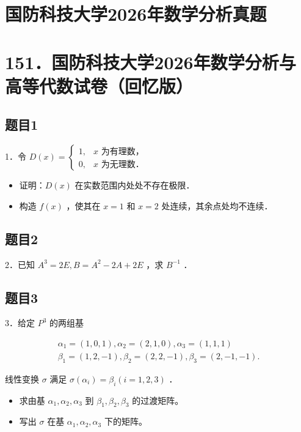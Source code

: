 \documentclass{article}
\begin{document}
\section*{国防科技大学2026年数学分析真题}
\section*{151．国防科技大学2026年数学分析与高等代数试卷（回忆版）}

\subsection{题目1}
1．令 \(D(x)= \begin{cases}1, & x \text { 为有理数，} \\ 0, & x \text { 为无理数．}\end{cases}\)

\begin{itemize}
  \item[（1）] 证明：\(D(x)\) 在实数范围内处处不存在极限．
  \item[（2）] 构造 \(f(x)\) ，使其在 \(x=1\) 和 \(x=2\) 处连续，其余点处均不连续．
\end{itemize}

\subsection{题目2}
2．已知 \(A^{3}=2 E, B=A^{2}-2 A+2 E\) ，求 \(B^{-1}\) ．

\subsection{题目3}
3．给定 \(P^{3}\) 的两组基

\[
\begin{gathered}
\alpha_{1}=(1,0,1), \alpha_{2}=(2,1,0), \alpha_{3}=(1,1,1) \\
\beta_{1}=(1,2,-1), \beta_{2}=(2,2,-1), \beta_{3}=(2,-1,-1) .
\end{gathered}
\]

线性变换 \(\sigma\) 满足 \(\sigma\left(\alpha_{i}\right)=\beta_{i}(i=1,2,3)\) ．

\begin{itemize}
  \item[（1）] 求由基 \(\alpha_{1}, \alpha_{2}, \alpha_{3}\) 到 \(\beta_{1}, \beta_{2}, \beta_{3}\) 的过渡矩阵。
  \item[（2）] 写出 \(\sigma\) 在基 \(\alpha_{1}, \alpha_{2}, \alpha_{3}\) 下的矩阵。
\end{itemize}
\end{document}
